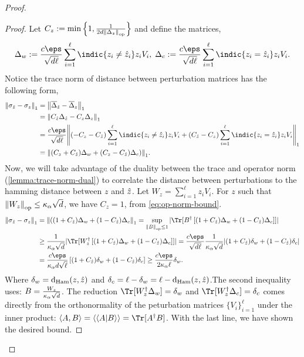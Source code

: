 \begin{proof}
   \begin{proof}
       
   Let $C_{z} := \min\left\{1, \frac{1}{2d {\left\|\Delta_{z}\right\|}_{\text{op}}}\right\}$ and define the matrices,
   \[\Delta_{w} := \frac{c \eps}{\sqrt{d\ell}}  \sum_{i=1}^\ell \indic{z_i \neq \hat{z}_i} z_i V_i, \;\Delta_{c} := \frac{c \eps}{\sqrt{d\ell}} \sum_{i=1}^\ell \indic{z_i = \hat{z}_i} z_i V_i.
   \]
   Notice the trace norm of distance between perturbation matrices has the following form,
   \begin{align*}   
   \tracenorm{\sigma_{\zest} - \sigma_{\ptb}} & = \tracenorm{\barDelta_{\hat{\ptb}} - \barDelta_{\ptb}} \\
   &=\tracenorm{C_{\hat{z}} \Delta_{\hat{\ptb}} - C_{z} \Delta_{\ptb}} \\
   &= \frac{c \eps}{\sqrt{d\ell}} \tracenorm{(-C_z-C_{\zest}) \sum_{i=1}^\ell \indic{z_i \neq \zest_i} z_i V_i + (C_{\zest} - C_z) \sum_{i=1}^\ell \indic{z_i = \zest_i} z_i V_i} \\
   &= \tracenorm{(C_z+C_{\zest}) \Delta_w + (C_z-C_{\zest}) \Delta_c)}.
   \end{align*}
    Now, we will take advantage of the duality between the trace and operator norm (\cref{lemma:trace-norm-dual}) to correlate the distance between perturbations to the hamming distance between $z$ and $\hat{{z}}$. Let $W_z = \sum_{i=1}^\ell z_i V_i$. For $z$ such that ${\left\|W_z\right\|}_{\text{op}} \leq \kappa_\alpha \sqrt{d}$, we have $C_z=1$, from \cref{eq:op-norm-bound}.
   \begin{align*}
    \tracenorm{\sigma_{\zest} - \sigma_{\ptb}} &=
     \tracenorm{((1+C_{\zest}) \Delta_w + (1-C_{\zest}) \Delta_c} = \sup_{\opnorm{B} \leq 1} |\Tr[B^{\dagger} \left[(1+C_{\zest}) \Delta_w + (1-C_{\zest}) \Delta_c\right]]| \\
     &\geq \frac{1}{\kappa_\alpha \sqrt{\dims}} 
     |\Tr[W_z^{\dagger} \left[(1+C_{\zest}) \Delta_w + (1-C_{\zest}) \Delta_c\right]]| = \frac{c \eps}{\sqrt{\dims \ell}} \frac{1}{\kappa_\alpha \sqrt{\dims}} |(1+C_{\zest}) \delta_w + (1-C_{\zest}) \delta_c| \\
     &= \frac{c \eps}{\kappa_\alpha d \sqrt{\ell}} \left[(1+C_{\zest}) \delta_w + (1-C_{\zest}) \delta_c\right] \geq \frac{c \eps}{2 \kappa_\alpha \ell} \delta_w.
   \end{align*}
   Where $\delta_w = \operatorname{d}_{\rm Ham}(z,\hat{{z}})$ and $\delta_c = \ell - \delta_w = \ell - \operatorname{d}_{\rm Ham}(z,\hat{{z}})$.The second inequality uses: $B = \frac{W_z}{\kappa_\alpha \sqrt{d}}$. The reduction $\Tr[W_z^{\dagger} \Delta_w] = \delta_w$ and $\Tr[W_z^{\dagger} \Delta_c] = \delta_c$ comes directly from the orthonormality of the peturbation matrices $\{V_i\}_{i=1}^\ell$ under the inner product: $\hdotprod{A}{B} = \vvdotprod{A}{B} = \Tr[A^\dagger B]$. With the last line, we have shown the desired bound.  
   \end{proof}
    

\end{proof}

